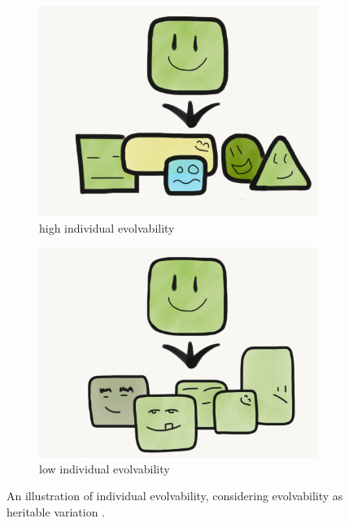 \begin{figure}
 \centering
    \begin{subfigure}[b]{0.45\textwidth}
        \centering
    	\includegraphics[width=\textwidth]{img/individual_evolvability.png}
        \caption{high individual evolvability}
        \label{subfig:high_individual_evolvability}
    \end{subfigure}%
    \hfill
    \begin{subfigure}[b]{0.45\textwidth}
        \centering
        \includegraphics[width=\textwidth]{img/low_individual_evolvability.png}
        \caption{low individual evolvability}
        \label{subfig:low_individual_evolvability}
    \end{subfigure}
  \captionsetup{singlelinecheck=off,justification=raggedright}
  \caption{An illustration of individual evolvability, considering evolvability as heritable variation \cite{Wilder2015ReconcilingEvolvability}.}
  \label{fig:high_vs_low_individual_evolvability}
\end{figure}
